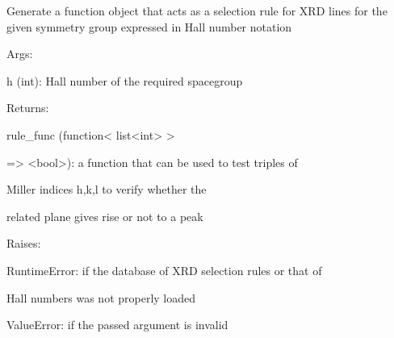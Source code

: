 \documentclass[letterpaper,10pt,english]{sphinxmanual}
\begin{document}
\begin{fulllineitems}
\label{doctree/soprano.calculate.xrd.sel_rules:soprano.calculate.xrd.sel_rules.get_sel_rule_from_hall}
Generate a function object that acts as a selection rule for XRD lines
for the given symmetry group expressed in Hall number notation

\begin{DUlineblock}{0em}
\item[] Args:
\item[]
\begin{DUlineblock}{\DUlineblockindent}
\item[] h (int): Hall number of the required spacegroup
\end{DUlineblock}
\end{DUlineblock}

\begin{DUlineblock}{0em}
\item[] Returns:
\item[]
\begin{DUlineblock}{\DUlineblockindent}
\item[] rule\_func (function\textless{} list\textless{}int\textgreater{} \textgreater{}
\item[]
\begin{DUlineblock}{\DUlineblockindent}
\item[] =\textgreater{} \textless{}bool\textgreater{}): a function that can be used to test triples of
\item[]
\begin{DUlineblock}{\DUlineblockindent}
\item[] Miller indices h,k,l to verify whether the
\item[] related plane gives rise or not to a peak
\end{DUlineblock}
\end{DUlineblock}
\end{DUlineblock}
\end{DUlineblock}

\begin{DUlineblock}{0em}
\item[] Raises:
\item[]
\begin{DUlineblock}{\DUlineblockindent}
\item[] RuntimeError: if the database of XRD selection rules or that of
\item[]
\begin{DUlineblock}{\DUlineblockindent}
\item[] Hall numbers was not properly loaded
\end{DUlineblock}
\item[] ValueError: if the passed argument is invalid
\end{DUlineblock}
\end{DUlineblock}

\end{fulllineitems}
\end{document}
